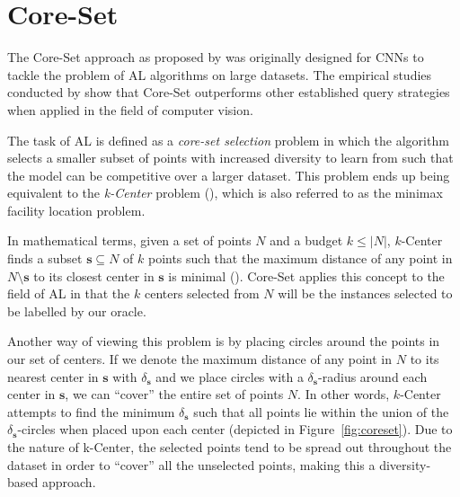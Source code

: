 \documentclass[english,bachelor,ul]{webisthesis} %
\begin{document}
\section{Core-Set}

The Core-Set approach as proposed by \cite{DBLP:conf/iclr/SenerS18} was originally designed for CNNs to tackle the problem of AL algorithms on large datasets. The empirical studies conducted by \cite{DBLP:conf/iclr/SenerS18} show that Core-Set outperforms other established query strategies when applied in the field of computer vision.

The task of AL is defined as a \textit{core-set selection} problem in which the algorithm selects a smaller subset of points with increased diversity to learn from such that the model can be competitive over a larger dataset. This problem ends up being equivalent to the \textit{k-Center} problem (\cite{DBLP:conf/iclr/SenerS18}), which is also referred to as the minimax facility location problem. 

In mathematical terms, given a set of points $ N $ and a budget $ k \leq |N| $, $k$-Center finds a subset $ \mathbf{s} \subseteq N $ of $ k $ points such that the maximum distance of any point in $ N \setminus \mathbf{s} $ to its closest center in $ \mathbf{s} $ is minimal (\cite{har2008geometric}). Core-Set applies this concept to the field of AL in that the $ k $ centers selected from $ N $ will be the instances selected to be labelled by our oracle.

Another way of viewing this problem is by placing circles around the points in our set of centers. If we denote the maximum distance of any point in $ N $ to its nearest center in $ \mathbf{s} $ with $ \delta_{\mathbf{s}} $ and we place circles with a $ \delta_{\mathbf{s}} $-radius around each center in $ \mathbf{s} $, we can ``cover'' the entire set of points $ N $. In other words, $k$-Center attempts to find the minimum $ \delta_{\mathbf{s}} $ such that all points lie within the union of the $ \delta_{\mathbf{s}} $-circles when placed upon each center (depicted in Figure~\ref{fig:coreset}). Due to the nature of k-Center, the selected points tend to be spread out throughout the dataset in order to ``cover'' all the unselected points, making this a diversity-based approach. 
\end{document}
